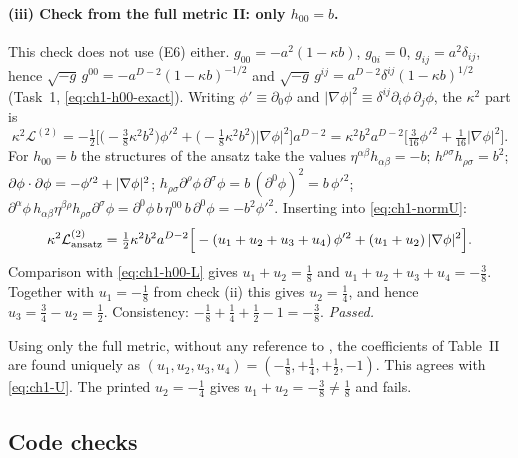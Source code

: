 \paragraph{(iii) Check from the full metric II: only $h_{00}=b$.} This check
does not use (E6) either. $g_{00}=-a^2(1-\kappa b)$, $g_{0i}=0$,
$g_{ij}=a^2\delta_{ij}$, hence
$\sqrt{-g}\,g^{00}=-a^{D-2}(1-\kappa b)^{-1/2}$ and
$\sqrt{-g}\,g^{ij}=a^{D-2}\delta^{ij}(1-\kappa b)^{1/2}$ (Task~1,
\eqref{eq:ch1-h00-exact}). Writing $\phi'\equiv\partial_0\phi$ and
$|\nabla\phi|^2\equiv\delta^{ij}\partial_i\phi\,\partial_j\phi$, the $\kappa^2$
part is
\begin{equation}
\kappa^2\mathcal L^{(2)}=-\tfrac12\Big[\big(-\tfrac38\kappa^2b^2\big)\phi'^2+\big(-\tfrac18\kappa^2b^2\big)|\nabla\phi|^2\Big]a^{D-2}=\kappa^2b^2a^{D-2}\Big[\tfrac3{16}\phi'^2+\tfrac1{16}|\nabla\phi|^2\Big].
\label{eq:ch1-h00-L}
\end{equation}
For $h_{00}=b$ the structures of the ansatz take the values
$\eta^{\alpha\beta}h_{\alpha\beta}=-b$;
$h^{\rho\sigma}h_{\rho\sigma}=b^2$;
$\partial\phi\cdot\partial\phi=-\phi'^2+|\nabla\phi|^2$;
$h_{\rho\sigma}\partial^\rho\phi\,\partial^\sigma\phi=b\,(\partial^0\phi)^2=b\,\phi'^2$;
$\partial^\alpha\phi\,h_{\alpha\beta}\eta^{\beta\rho}h_{\rho\sigma}\partial^\sigma\phi=\partial^0\phi\,b\,\eta^{00}\,b\,\partial^0\phi=-b^2\phi'^2$.
Inserting into \eqref{eq:ch1-normU}:
\begin{equation}
\kappa^2\mathcal L^{(2)}_{\rm ansatz}=\tfrac12\kappa^2b^2a^{D-2}\Big[-(u_1+u_2+u_3+u_4)\,\phi'^2+(u_1+u_2)\,|\nabla\phi|^2\Big].
\label{eq:ch1-h00-ansatz}
\end{equation}
Comparison with \eqref{eq:ch1-h00-L} gives $u_1+u_2=\tfrac18$ and
$u_1+u_2+u_3+u_4=-\tfrac38$. Together with $u_1=-\tfrac18$ from check (ii) this
gives $u_2=\tfrac14$, and hence $u_3=\tfrac34-u_2=\tfrac12$. Consistency:
$-\tfrac18+\tfrac14+\tfrac12-1=-\tfrac38$. \emph{Passed.}

\begin{resultbox}
Using only the full metric, without any reference to , the coefficients
of Table~II are found uniquely as
$(u_1,u_2,u_3,u_4)=(-\tfrac18,+\tfrac14,+\tfrac12,-1)$. This agrees with
\eqref{eq:ch1-U}. The printed $u_2=-\tfrac14$ gives
$u_1+u_2=-\tfrac38\neq\tfrac18$ and fails.
\end{resultbox}

\subsection{Code checks}
\label{sec:ch1-t2-code}

